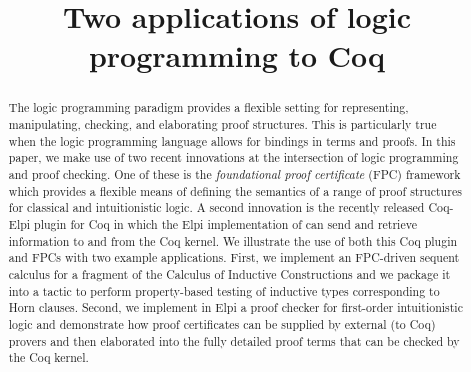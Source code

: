 \documentclass[a4paper,USenglish,cleveref, autoref, thm-restate]{lipics-v2019}
\title{Two applications of logic programming to Coq}
\begin{document}
\maketitle

\begin{abstract}
  The logic programming paradigm provides a flexible setting for
  representing, manipulating, checking, and elaborating proof
  structures.  This is particularly true when the logic programming
  language allows for bindings in terms and proofs.  In this paper, we
  make use of two recent innovations at the intersection of logic
  programming and proof checking.  One of these is the
  \emph{foundational proof certificate} (FPC) framework which provides
  a flexible means of defining the semantics of a range of proof
  structures for classical and intuitionistic logic.  A second
  innovation is the recently released Coq-Elpi plugin for Coq in which
  the Elpi implementation of \lP can send and retrieve information to
  and from the Coq kernel.  We illustrate the use of both this Coq
  plugin and FPCs with two example applications.  First, we implement
  an FPC-driven sequent calculus for a fragment of the Calculus of
  Inductive Constructions and we package it into a tactic to perform
  property-based testing of inductive types corresponding to Horn
  clauses.  Second, we implement in Elpi a proof checker for
  first-order intuitionistic logic and demonstrate how proof
  certificates can be supplied by external (to Coq) provers and then
  elaborated into the fully detailed proof terms that can be checked
  by the Coq kernel.
\end{abstract}
 








\appendix

\end{document}
